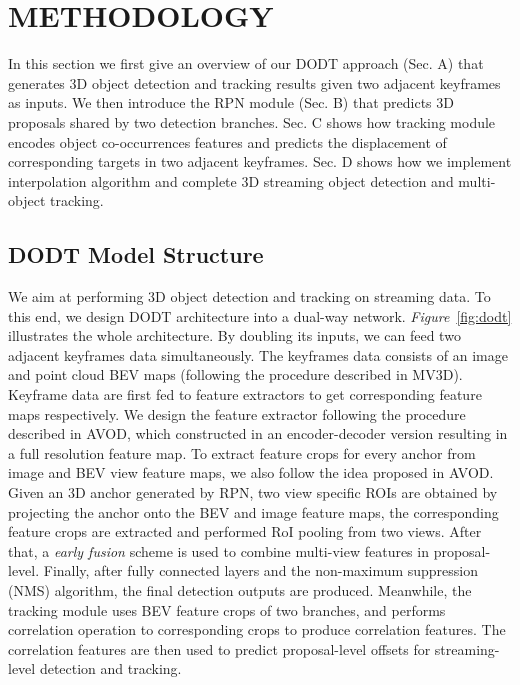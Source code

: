 \documentclass[letterpaper, 10 pt, conference]{ieeeconf}  %
\def\figurename{\emph{Figure}}
\begin{document}

\section{METHODOLOGY}

In this section we first give an overview of our DODT approach (Sec. A) that generates 3D object detection and tracking results given two adjacent keyframes as inputs. We then introduce the RPN module (Sec. B) that predicts 3D proposals shared by two detection branches. Sec. C shows how tracking module encodes object co-occurrences features and predicts the displacement of corresponding targets in two adjacent keyframes. Sec. D shows how we implement interpolation algorithm and complete 3D streaming object detection and multi-object tracking.

\subsection{DODT Model Structure} 

We aim at performing 3D object detection and tracking on streaming data. To this end, we design DODT architecture into a dual-way network. \figurename \, \ref{fig:dodt} illustrates the whole architecture. By doubling its inputs, we can feed two adjacent keyframes data simultaneously. The keyframes data consists of an image and point cloud BEV maps (following the procedure described in MV3D\cite{chen2017multi}). Keyframe data are first fed to feature extractors to get corresponding feature maps respectively. We design the feature extractor following the procedure described in AVOD\cite{ku2018joint}, which constructed in an encoder-decoder version resulting in a full resolution feature map. To extract feature crops for every anchor from image and BEV view feature maps, we also follow the idea proposed in AVOD\cite{ku2018joint}. Given an 3D anchor generated by RPN, two view specific ROIs are obtained by projecting the anchor onto the BEV and image feature maps, the corresponding feature crops are extracted and performed RoI pooling from two views. After that, a \textit{early fusion} scheme is used to combine multi-view features in proposal-level. Finally, after fully connected layers and the non-maximum suppression (NMS) algorithm, the final detection outputs are produced. Meanwhile, the tracking module uses BEV feature crops of two branches, and performs correlation operation to corresponding crops to produce correlation features. The correlation features are then used to predict proposal-level offsets for streaming-level detection and tracking.
\end{document}
